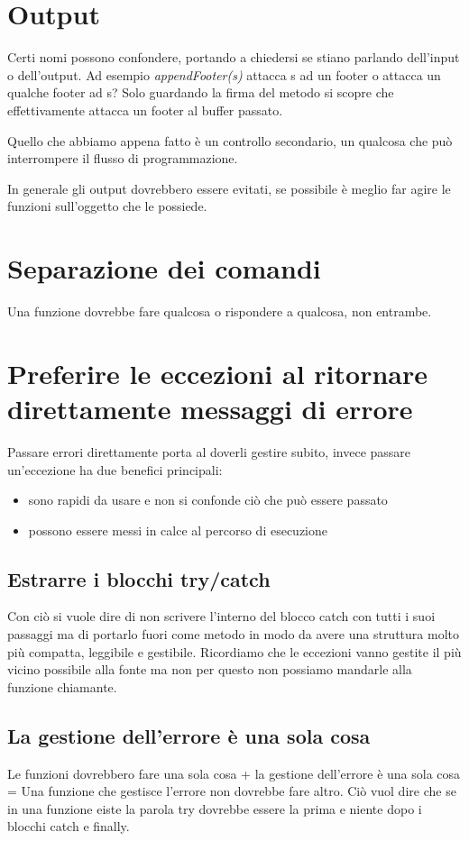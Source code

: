\documentclass[11pt,a4paper]{book}
\begin{document}
\section{Output}\label{par: output}
Certi nomi possono confondere, portando a chiedersi se stiano parlando dell'input o dell'output. Ad esempio \emph{appendFooter(s)} attacca s ad un footer o attacca un qualche footer ad s? Solo guardando la firma del metodo si scopre che
\label{code: 020}
effettivamente attacca un footer al buffer passato.

Quello che abbiamo appena fatto è un controllo secondario, un qualcosa che può interrompere il flusso di programmazione.

In generale gli output dovrebbero essere evitati, se possibile è meglio far agire le funzioni sull'oggetto che le possiede.

\section{Separazione dei comandi}
Una funzione dovrebbe fare qualcosa o rispondere a qualcosa, non entrambe.

\section{Preferire le eccezioni al ritornare direttamente messaggi di errore}
Passare errori direttamente porta al doverli gestire subito, invece passare un'eccezione ha due benefici principali:
\begin{itemize}
	\item sono rapidi da usare e non si confonde ciò che può essere passato
	\item possono essere messi in calce al percorso di esecuzione
\end{itemize}

\subsection{Estrarre i blocchi try/catch}
Con ciò si vuole dire di non scrivere l'interno del blocco catch con tutti i suoi passaggi ma di portarlo fuori come metodo in modo da avere una struttura molto più compatta, leggibile e gestibile. Ricordiamo che le eccezioni vanno gestite il più vicino possibile alla fonte ma non per questo non possiamo mandarle alla funzione chiamante.
\label{code: 021}

\subsection{La gestione dell'errore è una sola cosa}
Le funzioni dovrebbero fare una sola cosa + la gestione dell'errore è una sola cosa = Una funzione che gestisce l'errore non dovrebbe fare altro. Ciò vuol dire che se in una funzione eiste la parola try dovrebbe essere la prima e niente dopo i blocchi catch e finally.
\end{document}
